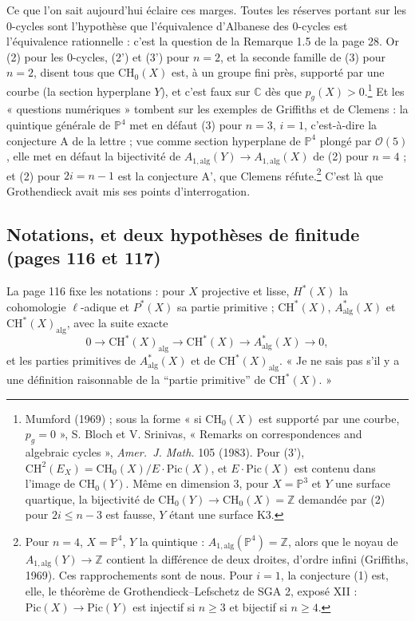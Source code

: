 \documentclass[11pt,a4paper]{article}
\begin{document}
Ce que l'on sait aujourd'hui éclaire ces marges. Toutes les réserves portant
sur les $0$-cycles sont l'hypothèse que l'équivalence d'Albanese des $0$-cycles
est l'équivalence rationnelle : c'est la question de la Remarque 1.5 de la page 28.
Or (2) pour les $0$-cycles, (2') et (3') pour $n = 2$, et la seconde famille de
(3) pour $n = 2$, disent tous que $\mathrm{CH}_{0}(X)$ est, à un groupe fini
près, supporté par une courbe (la section hyperplane $Y$), et c'est faux
sur $\mathbb{C}$ dès que $p_{g}(X) > 0$.\footnote{Mumford (1969) ; sous la forme
« si $\mathrm{CH}_{0}(X)$ est supporté par une courbe, $p_{g} = 0$ », S. Bloch et
V. Srinivas, « Remarks on correspondences and algebraic cycles », \emph{Amer.\ J. Math.} 105 (1983). Pour (3'), $\mathrm{CH}^{2}(E_{X}) =
\mathrm{CH}_{0}(X)/E\cdot\mathrm{Pic}(X)$, et $E\cdot\mathrm{Pic}(X)$ est contenu
dans l'image de $\mathrm{CH}_{0}(Y)$. Même en dimension $3$, pour $X =
\mathbb{P}^{3}$ et $Y$ une surface quartique, la bijectivité de
$\mathrm{CH}_{0}(Y) \to \mathrm{CH}_{0}(X) = \mathbb{Z}$ demandée par (2) pour $2i
\leqslant n - 3$ est fausse, $Y$ étant une surface K3.} Et les « questions
numériques » tombent sur les exemples de Griffiths et de Clemens : la
quintique générale de $\mathbb{P}^{4}$ met en défaut (3) pour $n = 3$, $i = 1$,
c'est-à-dire la conjecture A de la lettre ; vue comme section hyperplane de
$\mathbb{P}^{4}$ plongé par $\mathcal{O}(5)$, elle met en défaut la bijectivité
de $A_{1,\mathrm{alg}}(Y) \to A_{1,\mathrm{alg}}(X)$ de (2) pour $n = 4$ ; et (2)
pour $2i = n - 1$ est la conjecture A', que Clemens réfute.\footnote{Pour $n =
4$, $X = \mathbb{P}^{4}$, $Y$ la quintique : $A_{1,\mathrm{alg}}(\mathbb{P}^{4}) =
\mathbb{Z}$, alors que le noyau de $A_{1,\mathrm{alg}}(Y) \to \mathbb{Z}$ contient
la différence de deux droites, d'ordre infini (Griffiths, 1969). Ces
rapprochements sont de nous. Pour $i = 1$, la conjecture (1) est, elle, le
théorème de Grothendieck--Lefschetz de SGA 2, exposé XII : $\mathrm{Pic}(X) \to
\mathrm{Pic}(Y)$ est injectif si $n \geqslant 3$ et bijectif si $n \geqslant 4$.}
C'est là que Grothendieck avait mis ses points d'interrogation.

\subsection*{Notations, et deux hypothèses de finitude (pages 116 et 117)}

La page 116 fixe les notations : pour $X$ projective et lisse, $H^{*}(X)$ la
cohomologie $\ell$-adique et $P^{*}(X)$ sa partie primitive ;
$\mathrm{CH}^{*}(X)$, $A^{*}_{\mathrm{alg}}(X)$ et
$\mathrm{CH}^{*}(X)_{\mathrm{alg}}$, avec la suite exacte
\[
0 \longrightarrow \mathrm{CH}^{*}(X)_{\mathrm{alg}} \longrightarrow
\mathrm{CH}^{*}(X) \longrightarrow A^{*}_{\mathrm{alg}}(X) \longrightarrow 0 ,
\]
et les parties primitives de $A^{*}_{\mathrm{alg}}(X)$ et de
$\mathrm{CH}^{*}(X)_{\mathrm{alg}}$. « Je ne sais pas s'il y a une définition
raisonnable de la “partie primitive” de $\mathrm{CH}^{*}(X)$. »
\end{document}
